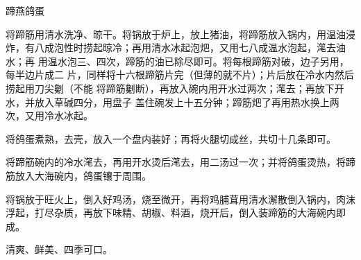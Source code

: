 %
%
%
%
%
%
%
\begin{recipe}{蹄燕鸽蛋}

\ingredients


\preparation

\step 将蹄筋用清水洗净、晾干。将锅放于炉上，放上猪油，将蹄筋放入锅内，用温油浸
炸，有八成泡性时捞起晾冷；再用清水冰起泡𤆵，又用七八成温水泡起，滗去油水；再
用温水泡三、四次，蹄筋的油已除尽即可。将每根蹄筋对破，边子另用，每半边片成二
片，同样将十六根蹄筋片完（但薄的就不片）；片后放在冷水内然后捞起用刀尖劖（不能
将蹄筋劖断），再放入碗内用开水过两次；滗去；再放下开水，并放入草碱四分，用盘子
盖住碗发上十五分钟；蹄筋𤆵了再用热水换上两次，又用冷水冰起。

\step 将鸽蛋煮熟，去壳，放入一个盘内装好；再将火腿切成丝，共切十几条即可。

\step 将蹄筋碗内的冷水滗去，再用开水烫后滗去，用二汤过一次；并将鸽蛋烫热，将蹄
筋放入大海碗内，鸽蛋镶于周围。

\step 将锅放于旺火上，倒入好鸡汤，烧至微开，再将鸡脯茸用清水澥散倒入锅内，肉沫
浮起，打尽杂质，再放下味精、胡椒、料酒，烧开后，倒入装蹄筋的大海碗内即成。

\features

清爽、鲜美、四季可口。

\end{recipe}

